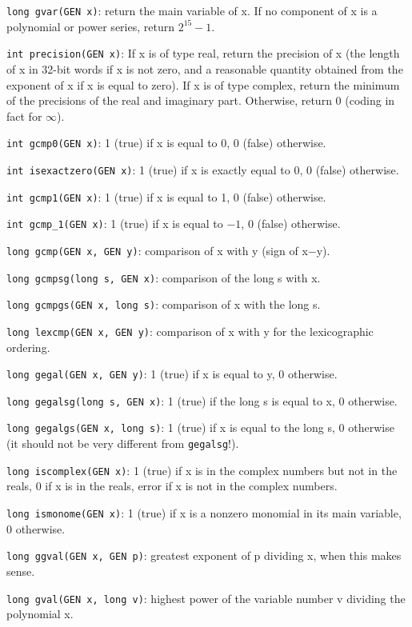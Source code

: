 {\tt long gvar(GEN x)}: return the main variable of x. If no component of
x is a polynomial or power series, return $2^{15}-1$.

{\tt int precision(GEN x)}: If x is of type real, return the precision of
x (the length of x in 32-bit words if x is not zero, and a reasonable
quantity obtained from the exponent of x if x is equal to zero). If x
is of type complex, return the minimum of the precisions of the real and
imaginary part. Otherwise, return 0 (coding in fact for $\infty$).


{\tt int gcmp0(GEN x)}: 1 (true) if x is equal to 0, 0 (false) otherwise.

{\tt int isexactzero(GEN x)}: 1 (true) if x is exactly equal to 0, 0 (false)
otherwise.

{\tt int gcmp1(GEN x)}: 1 (true) if x is equal to 1, 0 (false) otherwise.

{\tt int gcmp\_1(GEN x)}: 1 (true) if x is equal to $-1$, 0 (false) otherwise.

{\tt long gcmp(GEN x, GEN y)}: comparison of x with y (sign of x$-$y).

{\tt long gcmpsg(long s, GEN x)}: comparison of the long s with x.

{\tt long gcmpgs(GEN x, long s)}: comparison of x with the long s.

{\tt long lexcmp(GEN x, GEN y)}: comparison of x with y for the lexicographic
ordering.

{\tt long gegal(GEN x, GEN y)}: 1 (true) if x is equal to y, 0 otherwise.

{\tt long gegalsg(long s, GEN x)}: 1 (true) if the long s is equal to x, 0
otherwise.

{\tt long gegalgs(GEN x, long s)}: 1 (true) if x is equal to the long s, 0
otherwise (it should not be very different from {\tt gegalsg}!).

{\tt long iscomplex(GEN x)}: 1 (true) if x is in the complex numbers but not
in the reals, 0 if x is in the reals, error if x is not in the complex numbers.

{\tt long ismonome(GEN x)}: 1 (true) if x is a nonzero monomial in its main
variable, 0 otherwise.

{\tt long ggval(GEN x, GEN p)}: greatest exponent of p dividing x, when this
makes sense.

{\tt long gval(GEN x, long v)}: highest power of the variable number v dividing
the polynomial x.

